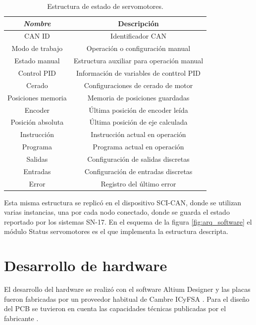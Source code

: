 \begin{table}[h]
	\centering
	\caption[Estructura de estado de servomotores.]{Estructura de estado de servomotores.}
	\begin{tabular}{c c}    
		\toprule
		\textbf{\textit{Nombre}}  & \textbf{Descripción}\\
		\midrule
		CAN ID  			& Identificador CAN							\\		
		Modo de trabajo		& Operación o configuración manual			\\
		Estado manual		& Estructura auxiliar para operación manual \\
		Control PID	 		& Información de variables de conttrol PID	\\
		Cerado				& Configuraciones de cerado de motor 		\\
		Posiciones memoria	& Memoria de posiciones guardadas	 		\\
		Encoder				& Última posición de encoder leída	 		\\
		Posición absoluta	& Última posición de eje calculada	 		\\
		Instrucción			& Instrucción actual en operación	 		\\
		Programa			& Programa actual en operación		 		\\
		Salidas				& Configuración de salidas discretas 		\\
		Entradas			& Configuración de entradas discretas 		\\
		Error				& Registro del último error			 		\\
		\bottomrule
		\hline
	\end{tabular}
	\label{tab:servo_status}
\end{table}

Esta misma estructura se replicó en el dispositivo SCI-CAN, donde se utilizan varias instancias, una por cada nodo conectado, donde se guarda el estado reportado por los sistemas SN-17. En el esquema de la figura \ref{fig:arq_software} el módulo Status servomotores es el que implementa la estructura descripta.

\section{Desarrollo de hardware}
\label{desarrollo_hw}

El desarrollo del hardware se realizó con el software Altium Designer \citep{web_altium} y las placas fueron fabricadas por un proveedor habitual de Cambre ICyFSA \citep{web_pcbwing}. Para el diseño del PCB se tuvieron en cuenta las capacidades técnicas publicadas por el fabricante \citep{web_pcbwing_capabilities}.

